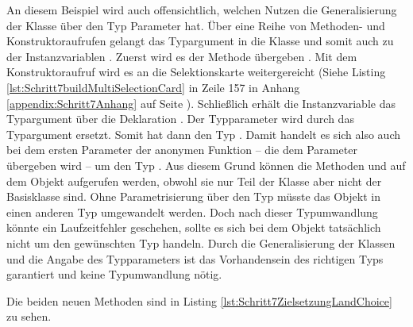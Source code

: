 An diesem Beispiel wird auch offensichtlich,
welchen Nutzen die Generalisierung der Klasse  über den Typ Parameter  hat.
Über eine Reihe von Methoden- und Konstruktoraufrufen gelangt das Typargument  in die Klasse  und somit auch zu der Instanzvariablen . Zuerst wird es der Methode  übergeben . 
Mit dem Konstruktoraufruf  wird es an die Selektionskarte weitergereicht (Siehe Listing \ref{lst:Schritt7buildMultiSelectionCard} in Zeile 157 in Anhang \ref{appendix:Schritt7Anhang} auf Seite \pageref{lst:Schritt7buildMultiSelectionCard}).
Schließlich erhält die Instanzvariable das Typargument über die Deklaration  .
Der Typparameter wird durch das Typargument ersetzt.
Somit hat  dann den Typ .
Damit handelt es sich also auch bei dem ersten Parameter  der anonymen Funktion --
die dem Parameter  übergeben wird  -- um den Typ .
Aus diesem Grund können die Methoden   und   auf dem Objekt  aufgerufen werden,
obwohl sie nur Teil der Klasse  aber nicht der Basisklasse  sind.
Ohne Parametrisierung über den Typ müsste das Objekt  in einen anderen Typ umgewandelt werden.
Doch nach dieser Typumwandlung könnte ein Laufzeitfehler geschehen, sollte es sich bei dem Objekt tatsächlich nicht um den gewünschten Typ handeln.
Durch die Generalisierung der Klassen und die Angabe des Typparameters ist das Vorhandensein des richtigen Typs garantiert und keine Typumwandlung nötig.

Die beiden neuen Methoden sind in Listing \ref{lst:Schritt7ZielsetzungLandChoice} zu sehen.


